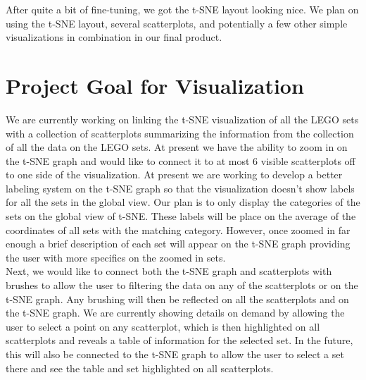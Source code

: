\documentclass[a4paper, 11pt]{article}
\begin{document}
After quite a bit of fine-tuning, we got the t-SNE layout looking nice. We plan on using the t-SNE layout, several scatterplots, and potentially a few other simple visualizations in combination in our final product.


\section*{Project Goal for Visualization}

We are currently working on linking the t-SNE visualization of all the LEGO sets with a collection of scatterplots summarizing the information from the collection of all the data on the LEGO sets. At present we have the ability to zoom in on the t-SNE graph and would like to connect it to at most 6 visible scatterplots off to one side of the visualization. At present we are working to develop a better labeling system on  the t-SNE graph so that the visualization doesn't show labels for all the sets in the global view. Our plan is to only display the categories of the sets on the global view of t-SNE. These labels  will be place on the average of the coordinates of all sets with the matching category. 
However, once zoomed in far enough a brief description of each set will appear on the t-SNE graph providing the user with more specifics on the zoomed in sets.  \\

Next, we would like to connect both the t-SNE graph and scatterplots with brushes to allow the user to filtering the data on any of the scatterplots or on the t-SNE graph. Any brushing will then be reflected on all the scatterplots and on the t-SNE graph. 
 We are currently showing details on demand by allowing the user to select a point on any scatterplot, which is then highlighted on all scatterplots and reveals a table of information for the selected set. In the future, this will also be connected to the t-SNE graph to allow the user to select a set there and see the table and set highlighted on all scatterplots.
\end{document}
